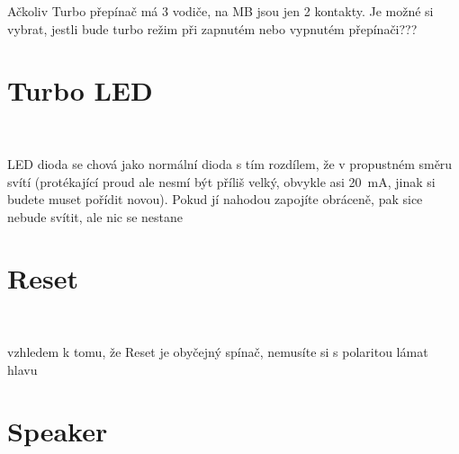 \itbul
 Ačkoliv Turbo přepínač má 3 vodiče, na MB jsou jen 2 kontakty. Je možné si
 vybrat, jestli bude turbo režim při zapnutém nebo vypnutém přepínači???

\section{Turbo LED}
 
\medskip
\hbox{\hskip 20pt
   }      
\medskip         

\itbul
  LED dioda se chová jako normální dioda s tím rozdílem, že v propustném
směru svítí (protékající proud ale nesmí být příliš velký, obvykle asi
20~mA, jinak si budete muset pořídit novou).
Pokud jí nahodou zapojíte obráceně, pak sice nebude svítit, ale nic
se nestane


\section{Reset}
 
\medskip
\hbox{\hskip 20pt
   }      
\medskip         

\itbul
  vzhledem k tomu, že Reset je obyčejný spínač, nemusíte si s polaritou
lámat hlavu

\section{Speaker}

